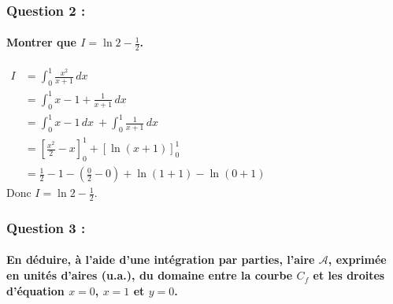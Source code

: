 \documentclass[a4paper, 12pt]{article}
\begin{document}
\subsubsection*{Question 2 :}
\paragraph*{Montrer que $I = \ln{2} - \frac{1}{2}$.\\[5mm]}
$\begin{aligned}
    I &= \displaystyle \int_0^1 \frac{x^2}{x+1}\,dx \\
    &= \displaystyle  \int_0^1 x-1 + \frac{1}{x+1} \,dx \\
    &= \displaystyle \int_0^1 x-1 \,dx\ + \displaystyle \int_0^1 \frac{1}{x+1} \,dx \\
    &= \left[ \frac{x^2}{2}-x\right]_0^1 + \left[\ln{\left(x+1\right)}\right]_0^1 \\
    &=\frac{1}{2}-1 - \left(\frac{0}{2}-0 \right) + \ln{\left( 1+1 \right)} - \ln{\left(0+1\right)}
\end{aligned}$
\\[2mm]
Donc $I = \ln{2} - \frac{1}{2}$.

{}
\subsubsection*{Question 3 :}
\paragraph*{En déduire, à l'aide d'une intégration par parties, l'aire $\mathcal{A}$, exprimée en unités d'aires (u.a.), 
du domaine entre la courbe $C_f$ et les droites d'équation $x = 0$, $x=1$ et $y=0$.\\[5mm]}
\end{document}
